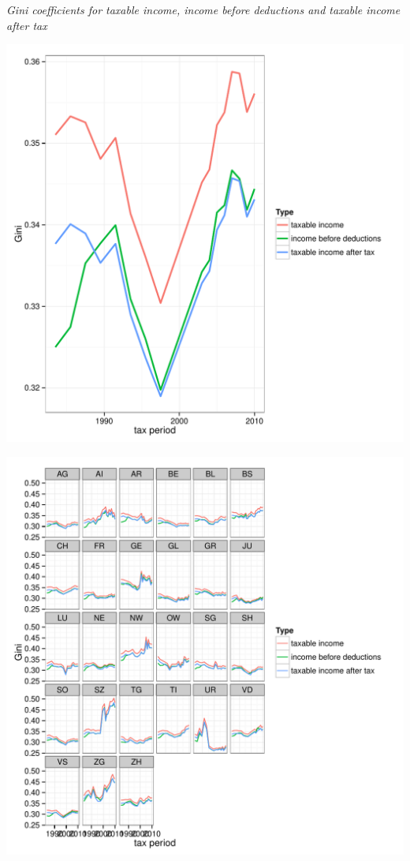 \documentclass[twoside]{article}\usepackage[]{graphicx}\usepackage[]{color}
\makeatletter
\def\maxwidth{ %
  \ifdim\Gin@nat@width>\linewidth
    \linewidth
  \else
    \Gin@nat@width
  \fi
}
\newenvironment{knitrout}{}{} %
\makeatother
\begin{document}
\begin{multicols}{2}
\emph{Gini coefficients for taxable income, income before deductions and taxable income after tax}




\begin{knitrout}
\color{fgcolor}
\includegraphics[width=\maxwidth]{figure/different_ginis1} 

\includegraphics[width=\maxwidth]{figure/different_ginis2} 


\end{knitrout}
\end{multicols}
\end{document}
